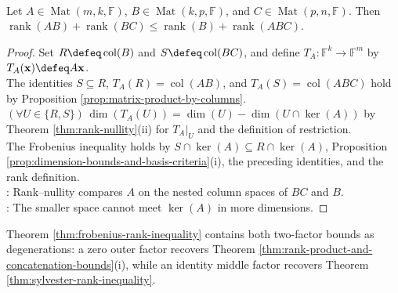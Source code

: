 \begin{theorem} \label{thm:frobenius-rank-inequality} \\
Let $A\in\operatorname{Mat}(m,k,\mathbb{F})$, $B\in\operatorname{Mat}(k,p,\mathbb{F})$, and $C\in\operatorname{Mat}(p,n,\mathbb{F})$. Then $\operatorname{rank}(AB)+\operatorname{rank}(BC)\leq\operatorname{rank}(B)+\operatorname{rank}(ABC)$.
\begin{proof}
Set $R\defeq\operatorname{col}(B)$ and $S\defeq\operatorname{col}(BC)$, and define $T_A:\mathbb{F}^k\to\mathbb{F}^m$ by $T_A(\mathbf{x})\defeq A\mathbf{x}$.\\
The identities $S\subseteq R$, $T_A(R)=\operatorname{col}(AB)$, and $T_A(S)=\operatorname{col}(ABC)$ hold by Proposition \ref{prop:matrix-product-by-columns}.\\
$(\forall U\in\{R,S\})\,\dim(T_A(U))=\dim(U)-\dim(U\cap\ker(A))$ by Theorem \ref{thm:rank-nullity}(ii) for $T_A|_U$ and the definition of restriction.\\
The Frobenius inequality holds by $S\cap\ker(A)\subseteq R\cap\ker(A)$, Proposition \ref{prop:dimension-bounds-and-basis-criteria}(i), the preceding identities, and the rank definition.\\
: Rank--nullity compares $A$ on the nested column spaces of $BC$ and $B$.\\
: The smaller space cannot meet $\ker(A)$ in more dimensions.
\end{proof}
\end{theorem}

Theorem \ref{thm:frobenius-rank-inequality} contains both two-factor bounds as degenerations: a zero outer factor recovers Theorem \ref{thm:rank-product-and-concatenation-bounds}(i), while an identity middle factor recovers Theorem \ref{thm:sylvester-rank-inequality}.

